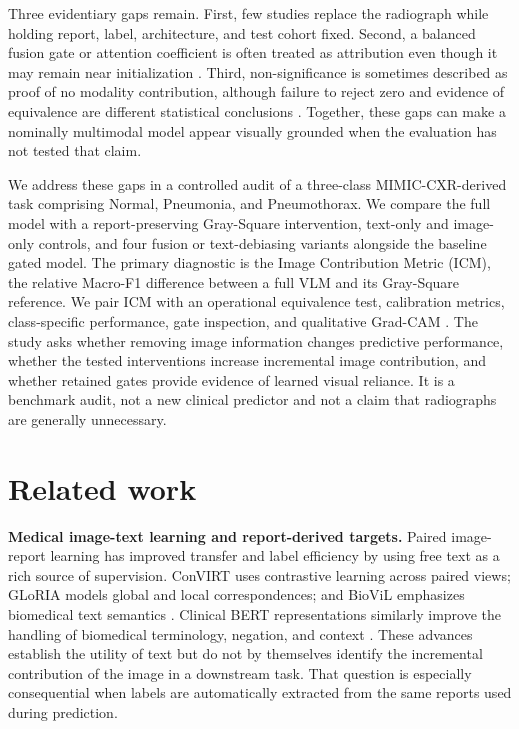 \documentclass[a4paper,fleqn]{cas-sc}
\begin{document}
Three evidentiary gaps remain. First, few studies replace the radiograph while
holding report, label, architecture, and test cohort fixed. Second, a balanced
fusion gate or attention coefficient is often treated as attribution even
though it may remain near initialization \cite{arevalo2017gmu}. Third,
non-significance is sometimes described as proof of no modality contribution,
although failure to reject zero and evidence of equivalence are different
statistical conclusions \cite{lakens2017equivalence}. Together, these gaps can
make a nominally multimodal model appear visually grounded when the evaluation
has not tested that claim.

We address these gaps in a controlled audit of a three-class
MIMIC-CXR-derived task comprising Normal, Pneumonia, and Pneumothorax. We
compare the full model with a report-preserving Gray-Square intervention,
text-only and image-only controls, and four fusion or text-debiasing variants
alongside the baseline gated model. The primary diagnostic is the Image
Contribution Metric (ICM), the relative Macro-F1 difference between a full VLM
and its Gray-Square reference. We pair ICM with an operational equivalence test,
calibration metrics, class-specific performance, gate inspection, and
qualitative Grad-CAM \cite{selvaraju2017gradcam}. The study asks whether
removing image information changes predictive performance, whether the tested
interventions increase incremental image contribution, and whether retained
gates provide evidence of learned visual reliance. It is a benchmark audit,
not a new clinical predictor and not a claim that radiographs are generally
unnecessary.

\section{Related work}\label{sec:related-work}

\textbf{Medical image-text learning and report-derived targets.}
Paired image-report learning has improved transfer and label efficiency by
using free text as a rich source of supervision. ConVIRT uses contrastive
learning across paired views; GLoRIA models global and local correspondences;
and BioViL emphasizes biomedical text semantics
\cite{zhang2022convirt,huang2021gloria,boecking2022textsemantics}. Clinical BERT
representations similarly improve the handling of biomedical terminology,
negation, and context \cite{alsentzer2019clinicalbert,devlin2019bert}. These
advances establish the utility of text but do not by themselves identify the
incremental contribution of the image in a downstream task. That question is
especially consequential when labels are automatically extracted from the same
reports used during prediction.
\end{document}
